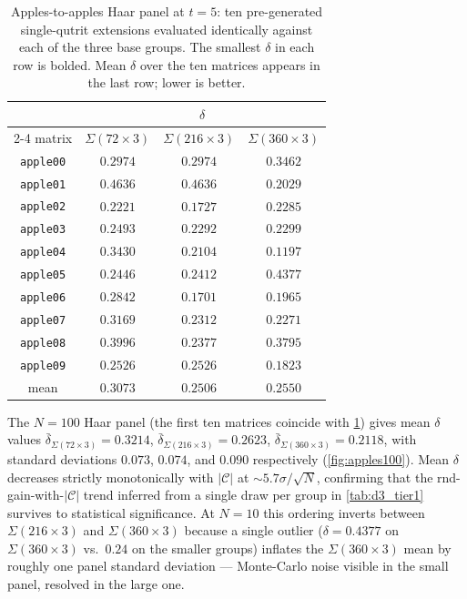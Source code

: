 \documentclass[twocolumn,superscriptaddress,showpacs,nofootinbib,notitlepage,preprintnumbers,secnumarabic,amssymb, nobibnotes, aps, prd]{revtex4-2}
\let\origtoprule\toprule
\let\origbottomrule\bottomrule
\renewcommand{\toprule}{\origtoprule\origtoprule}%
\renewcommand{\bottomrule}{\origbottomrule\origbottomrule}%
\newcommand{\Sigmathree}[1]{\Sigma(#1\!\times\!3)} %
\begin{document}
\begin{table}[t]
\centering
\caption{\label{tab:d3_apples}Apples-to-apples Haar panel at $t=5$: ten pre-generated single-qutrit extensions evaluated identically against each of the three base groups. The smallest $\delta$ in each row is bolded. Mean $\delta$ over the ten matrices appears in the last row; lower is better.}
\begin{tabular}{cccc}
\toprule
        & \multicolumn{3}{c}{$\delta$} \\
\cmidrule(lr){2-4}
matrix  & $\Sigmathree{72}$ & $\Sigmathree{216}$ & $\Sigmathree{360}$ \\
\midrule
\texttt{apple00} & $\mathbf{0.2974}$ & $\mathbf{0.2974}$ & $0.3462$ \\
\texttt{apple01} & $0.4636$ & $0.4636$ & $\mathbf{0.2029}$ \\
\texttt{apple02} & $0.2221$ & $\mathbf{0.1727}$ & $0.2285$ \\
\texttt{apple03} & $0.2493$ & $\mathbf{0.2292}$ & $0.2299$ \\
\texttt{apple04} & $0.3430$ & $0.2104$ & $\mathbf{0.1197}$ \\
\texttt{apple05} & $0.2446$ & $\mathbf{0.2412}$ & $0.4377$ \\
\texttt{apple06} & $0.2842$ & $\mathbf{0.1701}$ & $0.1965$ \\
\texttt{apple07} & $0.3169$ & $0.2312$ & $\mathbf{0.2271}$ \\
\texttt{apple08} & $0.3996$ & $\mathbf{0.2377}$ & $0.3795$ \\
\texttt{apple09} & $0.2526$ & $0.2526$ & $\mathbf{0.1823}$ \\
\midrule
mean & $0.3073$ & $\mathbf{0.2506}$ & $0.2550$ \\
\bottomrule
\end{tabular}
\end{table}

The $N=100$ Haar panel (the first ten matrices coincide with \cref{tab:d3_apples}) gives mean $\delta$ values $\bar\delta_{\Sigmathree{72}}=0.3214$, $\bar\delta_{\Sigmathree{216}}=0.2623$, $\bar\delta_{\Sigmathree{360}}=0.2118$, with standard deviations $0.073$, $0.074$, and $0.090$ respectively (\cref{fig:apples100}). Mean $\delta$ decreases strictly monotonically with $|\mathcal{C}|$ at $\sim\!5.7\sigma/\sqrt{N}$, confirming that the rnd-gain-with-$|\mathcal{C}|$ trend inferred from a single draw per group in \cref{tab:d3_tier1} survives to statistical significance. At $N=10$ this ordering inverts between $\Sigmathree{216}$ and $\Sigmathree{360}$ because a single outlier ($\delta=0.4377$ on $\Sigmathree{360}$ vs.\ $0.24$ on the smaller groups) inflates the $\Sigmathree{360}$ mean by roughly one panel standard deviation --- Monte-Carlo noise visible in the small panel, resolved in the large one.
\end{document}
